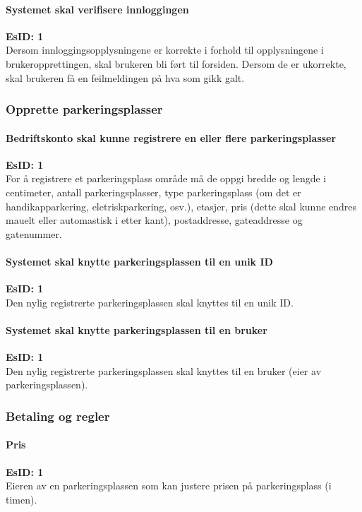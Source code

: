 \documentclass[12pt]{article}
\newcommand{\EsID}[1]{\textbf{EsID: #1}\\}
\begin{document}
            \paragraph{Systemet skal verifisere innloggingen}
            \EsID{1}
            Dersom innloggingsopplysningene er korrekte i forhold til opplysningene i brukeropprettingen, skal brukeren bli ført til forsiden. Dersom de er ukorrekte, skal brukeren få en feilmeldingen på hva som gikk galt.

        \subsubsection{Opprette parkeringsplasser}

            \paragraph{Bedriftskonto skal kunne registrere en eller flere parkeringsplasser}
            \EsID{1}
            For å registrere et parkeringsplass område må de oppgi bredde og lengde i centimeter, antall parkeringsplasser, type parkeringsplass (om det er handikapparkering, eletriskparkering, osv.), etasjer, pris (dette skal kunne endres mauelt eller automastisk i etter kant), postaddresse, gateaddresse og gatenummer.

            \paragraph{Systemet skal knytte parkeringsplassen til en unik ID}
            \EsID{1}
            Den nylig registrerte parkeringsplassen skal knyttes til en unik ID.

            \paragraph{Systemet skal knytte parkeringsplassen til en bruker}
            \EsID{1}
            Den nylig registrerte parkeringsplassen skal knyttes til en bruker (eier av parkeringsplassen).

        \subsubsection{Betaling og regler}

            \paragraph{Pris}
            \EsID{1}
            Eieren av en parkeringsplassen som kan justere prisen på parkeringsplass (i timen).
\end{document}
